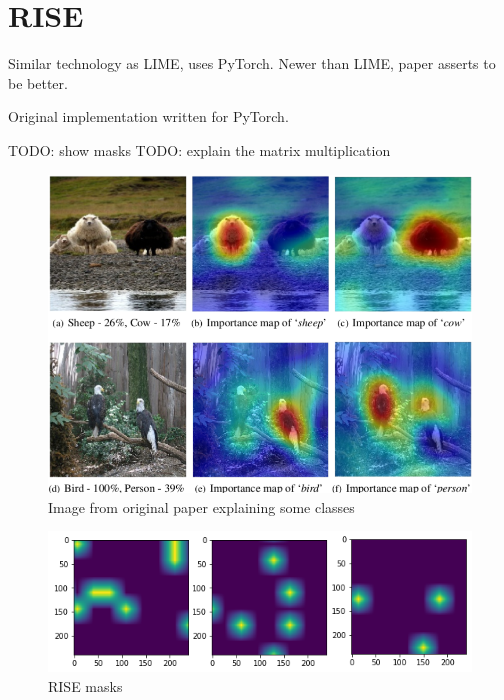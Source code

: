 \section{RISE}
Similar technology as LIME, uses PyTorch. Newer than LIME, paper asserts to be better.

Original implementation written for PyTorch.

TODO: show masks
TODO: explain the matrix multiplication

\begin{figure}[h]
\centering
\caption{Image from original paper explaining some classes}
\includegraphics[width=12cm]{chapters/02_methods/images/rise.png}
\end{figure}

\begin{figure}[h]
\centering
\caption{RISE masks}
\includegraphics[width=14cm]{chapters/02_methods/images/rise-masks.png}
\end{figure}
